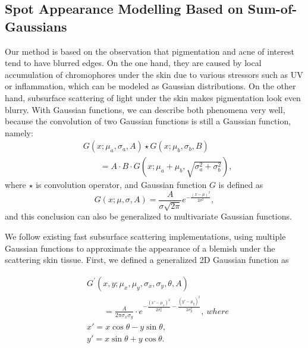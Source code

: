 \begin{spacing}{1.5}
\section{Spot Appearance Modelling Based on Sum-of-Gaussians}
Our method is based on the observation that pigmentation and acne of interest tend to have blurred edges. On the one hand, they are caused by local accumulation of chromophores under the skin due to various stressors such as UV or inflammation, which can be modeled as Gaussian distributions. On the other hand, subsurface scattering of light under the skin makes pigmentation look even blurry. With Gaussian functions, we can describe both phenomena very well, because the convolution of two Gaussian functions is still a Gaussian function, namely:
\begin{equation}
    \begin{aligned}
         & G(x; \mu_a, \sigma_a, A)\star G(x; \mu_b, \sigma_b, B)                 \\
         & \qquad= A\cdot B\cdot G(x; \mu_a+\mu_b, \sqrt{\sigma_a^2+\sigma_b^2}),
    \end{aligned}
\end{equation}
where $\star$ is convolution operator, and Gaussian function $G$ is defined as
\begin{equation}
    G(x; \mu, \sigma, A) = \frac{A}{\sigma\sqrt{2\pi}}e^{-\frac{{(x - \mu)^2}}{{2\sigma^2}}},
\end{equation}
and this conclusion can also be generalized to multivariate Gaussian functions.

We follow existing fast subsurface scattering implementations, using multiple Gaussian functions to approximate the appearance of a blemish under the scattering skin tissue. First, we defined a generalized 2D Gaussian function as

\begin{equation}
    \begin{aligned}
         & G^\prime(x, y; \mu_x, \mu_y, \sigma_x, \sigma_y, \theta, A)                                                                                 \\
         & \qquad=\frac{A}{2\pi \sigma_x \sigma_y}\cdot e^{-\frac{{(x' - \mu_x)^2}}{{2 \sigma_x^2}} - \frac{{(y' - \mu_y)^2}}{{2 \sigma_y^2}}},\ where \\
         & x' = x \cos\theta - y \sin\theta,                                                                                                           \\
         & y' = x \sin\theta + y \cos\theta.
    \end{aligned}
\end{equation}


\end{spacing}
